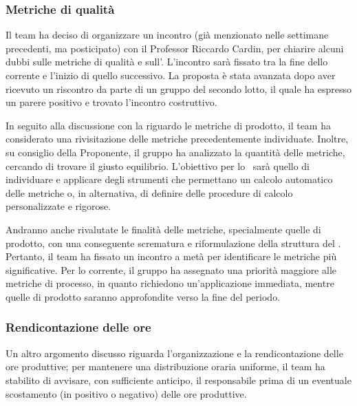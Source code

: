 \subsubsection{Metriche di qualità}
\par Il team ha deciso di organizzare un incontro (già menzionato nelle settimane precedenti, ma posticipato) con il Professor Riccardo Cardin, per chiarire alcuni dubbi sulle metriche di qualità e sull'\AdR. L'incontro sarà fissato tra la fine dello  corrente e l'inizio di quello successivo.
La proposta è stata avanzata dopo aver ricevuto un riscontro da parte di un gruppo del secondo lotto, il quale ha espresso un parere positivo e trovato l'incontro costruttivo.
\par In seguito alla discussione con la  riguardo le metriche di prodotto, il team ha considerato una rivisitazione delle metriche precedentemente individuate. Inoltre, su consiglio della Proponente, il gruppo ha analizzato la quantità delle metriche, cercando di trovare il giusto equilibrio.
L'obiettivo per lo \ sarà quello di individuare e applicare degli strumenti che permettano un calcolo automatico delle metriche o, in alternativa, di definire delle procedure di calcolo personalizzate e rigorose. 

\par Andranno anche rivalutate le finalità delle metriche, specialmente quelle di prodotto, con una conseguente scrematura e riformulazione della struttura del \PdQ.
Pertanto, il team ha fissato un incontro a metà  per identificare le metriche più significative.
Per lo  corrente, il gruppo ha assegnato una priorità maggiore alle metriche di processo, in quanto richiedono un'applicazione immediata, mentre quelle di prodotto saranno approfondite verso la fine del periodo.
\subsubsection{Rendicontazione delle ore}
\par Un altro argomento discusso riguarda l'organizzazione e la rendicontazione delle ore produttive; per mantenere una distribuzione oraria uniforme, il team ha stabilito di avvisare, con sufficiente anticipo, il responsabile prima di un eventuale scostamento (in positivo o negativo) delle ore produttive.
